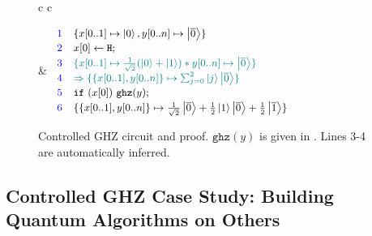 \begin{figure}[!hbt]
{\centering
{
\begin{tabular}[b]{c c}


&
{
$\small
\begin{array}{r l}
\textcolor{blue}{1}
&
\{x[0..1]\mapsto \ket{0},y[0..n]\mapsto \ket{\overline{0}}\}\\[0.2em]
\textcolor{blue}{2}
&
\ssassign{x[0]}{}{\ihadh};\\[0.2em]

\textcolor{blue}{3}
&
\textcolor{teal}{
\{x[0..1]\mapsto \frac{1}{\sqrt{2}}(\ket{0}+\ket{1}) * y[0..n]\mapsto \ket{\overline{0}}\}
}
\\[0.2em]

\textcolor{blue}{4}
&
\textcolor{teal}{
\Rightarrow
\{\{x[0..1],y[0..n]\}\mapsto \scha{2}{}{j}{\ket{\overline{0}}}\}
}
\\[0.2em]

\textcolor{blue}{5}
&
\sifq{x[0]}{\texttt{ghz}(y)};
\\[0.2em]

\textcolor{blue}{6}
&
\{\{x[0..1],y[0..n]\}\mapsto \frac{1}{\sqrt{2}}\ket{\overline{0}}+\frac{1}{2}\ket{1}\ket{\overline{0}}+\frac{1}{2}\ket{\overline{1}} \}
\end{array}
$
}
\end{tabular}
}
}
\vspace*{-0.5em}
\caption{Controlled GHZ circuit and proof. $\texttt{ghz}(y)$ is given in . Lines 3-4 are automatically inferred.}
\label{fig:background-circuit-example-controlled}
\end{figure}

\subsection{Controlled GHZ Case Study: Building Quantum Algorithms on Others}

